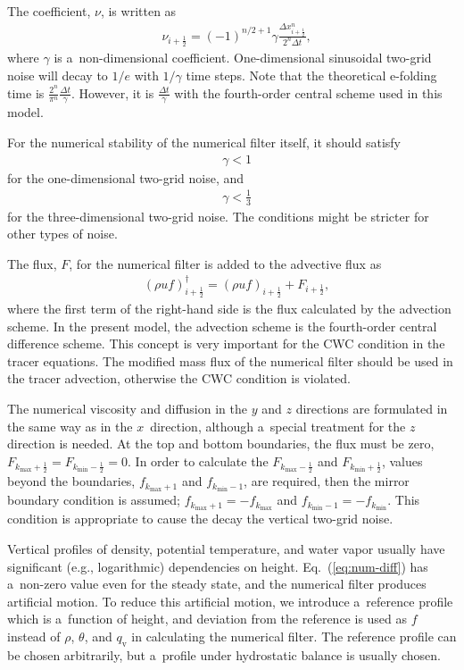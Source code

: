 The coefficient, $\nu$, is written as
\begin{align}
&\nu_{i+\frac{1}{2}} = (-1)^{n/2+1} \gamma \frac{\Delta x_{i+\frac{1}{2}}^n}{2^n\Delta t},
\end{align}
where $\gamma$ is a~non-dimensional coefficient.
One-dimensional sinusoidal two-grid noise will decay to $1/e$ with $1/\gamma$ time steps.
Note that the theoretical e-folding time is $\frac{2^n}{\pi^n}\frac{\Delta t}{\gamma}$.
However, it is $\frac{\Delta t}{\gamma}$ with the fourth-order central scheme used in this model.


For the numerical stability of the numerical filter itself, it should satisfy
\begin{align}
&\gamma < 1
\end{align}
for the one-dimensional two-grid noise, and
\begin{align}
&\gamma < \frac{1}{3} \label{eq:condition-gamma}
\end{align}
for the three-dimensional two-grid noise.
The conditions might be stricter for other types of noise.

The flux, $F$, for the numerical filter is added to the advective flux as
\begin{align}
&(\rho u f)_{i+\frac{1}{2}}^{\dagger} = (\rho u f)_{i+\frac{1}{2}}+F_{i+\frac{1}{2}},
\end{align}
where the first term of the right-hand side is the flux calculated by the advection scheme.
In the present model, the advection scheme is the fourth-order central difference scheme.
This concept is very important for the CWC condition in the tracer equations.
The modified mass flux of the numerical filter should be used in the tracer advection, otherwise the CWC condition is violated.

The numerical viscosity and diffusion in the $y$ and $z$ directions are formulated in the same way as in the $x$~direction, although a~special treatment for the $z$ direction is needed.
At the top and bottom boundaries, the flux must be zero, $F_{k_{\max}+\frac{1}{2}} = F_{k_{\min}-\frac{1}{2}} = 0$.
In order to calculate the $F_{k_{\max}-\frac{1}{2}}$ and $F_{k_{\min}+\frac{1}{2}}$, values beyond the boundaries, $f_{k_{\max}+1}$ and $f_{k_{\min}-1}$, are required, then the mirror boundary condition is assumed; $f_{k_{\max}+1} = -f_{k_{\max}}$ and $f_{k_{\min}-1} = -f_{k_{\min}}$.
This condition is appropriate to cause the decay the vertical two-grid noise.


Vertical profiles of density, potential temperature, and water vapor usually have significant (e.g., logarithmic) dependencies on height.
Eq.~(\ref{eq:num-diff}) has a~non-zero value even for the steady state, and the numerical filter produces artificial motion.
To reduce this artificial motion, we introduce a~reference profile which is a~function of height, and deviation from the reference is used as $f$ instead of $\rho$, $\theta$, and $q_{\mathrm{v}}$ in calculating the numerical filter.
The reference profile can be chosen arbitrarily, but a~profile under hydrostatic balance is usually chosen.





